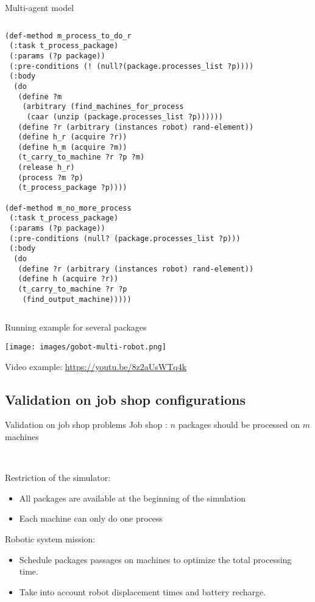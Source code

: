 \begin{frame}[fragile]{Multi-agent model}
\begin{columns}[t]
\begin{column}{0.5\textwidth}
\begin{lstlisting}
(def-method m_process_to_do_r
 (:task t_process_package)
 (:params (?p package))
 (:pre-conditions (! (null?(package.processes_list ?p))))
 (:body
  (do
   (define ?m
    (arbitrary (find_machines_for_process
     (caar (unzip (package.processes_list ?p))))))
   (define ?r (arbitrary (instances robot) rand-element))
   (define h_r (acquire ?r))
   (define h_m (acquire ?m))
   (t_carry_to_machine ?r ?p ?m)
   (release h_r)
   (process ?m ?p)
   (t_process_package ?p))))                  

(def-method m_no_more_process
 (:task t_process_package)
 (:params (?p package))
 (:pre-conditions (null? (package.processes_list ?p)))
 (:body
  (do
   (define ?r (arbitrary (instances robot) rand-element))
   (define h (acquire ?r))
   (t_carry_to_machine ?r ?p
    (find_output_machine)))))            
        \end{lstlisting}
    \end{column}
\end{columns}
 
\end{frame}

\begin{frame}{Running example for several packages}
    \centering

    \texttt{[image: images/gobot-multi-robot.png]}
    \Large

    Video example: \href{https://youtu.be/8z2aUsWTq4k}{https://youtu.be/8z2aUsWTq4k}
\end{frame}

\subsection{Validation on job shop configurations}
\begin{frame}[fragile]{Validation on job shop problems}
Job shop : $n$ packages should be processed on $m$ machines

~~

Restriction of the simulator:
\begin{itemize}
    \item All packages are available at the beginning of the simulation
    \item Each machine can only do one process
\end{itemize}

Robotic system mission:
\begin{itemize}
    \pause
    \item Schedule packages passages on machines to optimize the total processing time.
    \pause
    \item Take into account robot displacement times and battery recharge.
\end{itemize}
\end{frame}


